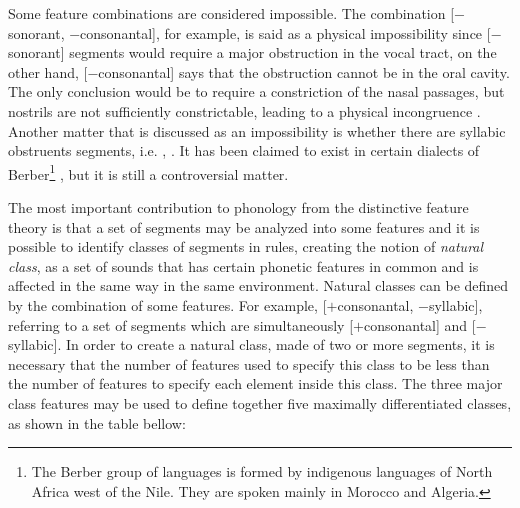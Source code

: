 Some feature combinations are considered impossible. The combination [$-$sonorant, $-$consonantal], for example, is said as a physical impossibility since [$-$sonorant] segments would require a major obstruction in the vocal tract, on the other hand, [$-$consonantal] says that the obstruction cannot be in the oral cavity. The only conclusion would be to require a constriction of the nasal passages, but nostrils are not sufficiently constrictable, leading to a physical incongruence \citep{odden2005}. Another matter that is discussed as an impossibility is whether there are syllabic obstruents segments, i.e. \textipa{[\s{s}]}, \textipa{[\s{k}]}. It has been claimed  to exist in certain dialects of Berber\footnote{The Berber group of languages is formed by indigenous languages of North Africa west of the Nile. They are spoken mainly in Morocco and Algeria.} \citep{odden2005}, but it is still a controversial matter.

The most important contribution to phonology from the distinctive feature theory is that a set of segments may be analyzed into some features and it is possible to identify classes of segments in rules, creating the notion of \textit{natural class}, as a set of sounds that has certain phonetic features in common and is affected in the same way in the same environment. Natural classes can be defined by the combination of some features. For example, [$+$consonantal, $-$syllabic], referring to a set of segments which are simultaneously [$+$consonantal] and [$-$syllabic]. In order to create a natural class,  made of two or more segments, it is necessary that the number of features used to specify this class to be less than the number of features to specify each element inside this class. The three major class features may be used to define together five maximally differentiated classes, as shown in the table bellow:

